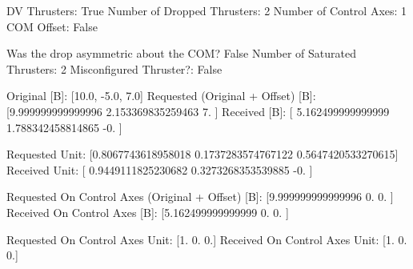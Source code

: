 DV Thrusters:	True
Number of Dropped Thrusters:	2
Number of Control Axes:	1
COM Offset:	False

Was the drop asymmetric about the COM?	False
Number of Saturated Thrusters:	2
Misconfigured Thruster?:	False

Original [B]:	[10.0, -5.0, 7.0]
Requested (Original + Offset) [B]:	[9.999999999999996 2.153369835259463 7.               ]
Received [B]:		[ 5.162499999999999  1.788342458814865 -0.               ]

Requested Unit:		[0.8067743618958018 0.1737283574767122 0.5647420533270615]
Received Unit:		[ 0.9449111825230682  0.3273268353539885 -0.                ]

Requested On Control Axes (Original + Offset) [B]:	[9.999999999999996 0.                0.               ]
Received On Control Axes [B]:		[5.162499999999999 0.                0.               ]

Requested On Control Axes Unit:		[1. 0. 0.]
Received On Control Axes Unit:		[1. 0. 0.]

